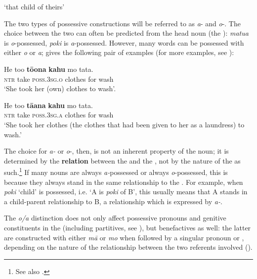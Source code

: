 \glt
‘that child of theirs’\textstyleExampleref{} 
\z

The two types of possessive constructions will be referred to as \textit{a}{}- and \textit{o}{}-. The choice between the two can often be predicted from the head noun (the ): \textit{matu{\ꞌ}a} is \textit{o}{}-possessed, \textit{poki} is \textit{a}{}-possessed. However, many words can be possessed with either \textit{o} or \textit{{\ꞌ}a}; \citet[43]{Englert1978} gives the following pair of examples (for more examples, see ):

\ea\label{ex:6.58}
\gll He to{\ꞌ}o \textbf{tō{\ꞌ}ona} \textbf{kahu} mo tata. \\
\textsc{ntr} take \textsc{poss.3sg.o} clothes for wash \\

\glt 
‘She took her (own) clothes to wash’.\textstyleExampleref{} 
\z

\ea\label{ex:6.59}
\gll He to{\ꞌ}o \textbf{tā{\ꞌ}ana} \textbf{kahu} mo tata. \\
\textsc{ntr} take \textsc{poss.3sg.a} clothes for wash \\

\glt
‘She took her clothes (the clothes that had been given to her as a laundress) to wash.’\textstyleExampleref{} 
\z

The choice for \textit{{\ꞌ}a-} or \textit{o}{}-, then, is not an inherent property of the noun; it is determined by the \textbf{relation} between the  and the , not by the nature of the  as such.\footnote{\label{fn:296}See also \citet[151]{Chapin1978}.} If many nouns are always \textit{a-}possessed or always \textit{o}{}-possessed, this is because they always stand in the same relationship to the . For example, when \textit{poki} ‘child’ is possessed, i.e. ‘A is \textit{poki} of B’, this usually means that A stands in a child-parent relationship to B, a relationship which is expressed by \textit{a-}.

The \textit{o/a} distinction does not only affect possessive pronouns and genitive constituents in the  (including partitives, see ), but benefactives as well: the latter are constructed with either \textit{mā} or \textit{mo} when followed by a singular pronoun or , depending on the nature of the relationship between the two referents involved ().

